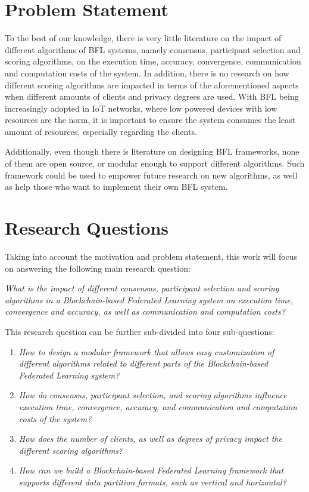 \section{Problem Statement}\label{intro:problem}

To the best of our knowledge, there is very little literature on the impact of different algorithms of BFL systems, namely consensus, participant selection and scoring algorithms, on the execution time, accuracy, convergence, communication and computation costs of the system. In addition, there is no research on how different scoring algorithms are impacted in terms of the aforementioned aspects when different amounts of clients and privacy degrees are used. With BFL being increasingly adopted in IoT networks, where low powered devices with low resources are the norm, it is important to ensure the system consumes the least amount of resources, especially regarding the clients.

Additionally, even though there is literature on designing BFL frameworks, none of them are open source, or modular enough to support different algorithms. Such framework could be used to empower future research on new algorithms, as well as help those who want to implement their own BFL system.

\section{Research Questions}\label{intro:questions}

Taking into account the motivation and problem statement, this work will focus on answering the following main research question:

\begin{center}
    \textit{What is the impact of different consensus, participant selection and scoring algorithms in a Blockchain-based Federated Learning system on execution time, convergence and accuracy, as well as communication and computation costs?}
\end{center}

This research question can be further sub-divided into four sub-questions:

\begin{enumerate}
    \item \textit{How to design a modular framework that allows easy customization of different algorithms related to different parts of the Blockchain-based Federated Learning system?}
    
    \item \textit{How do consensus, participant selection, and scoring algorithms influence execution time, convergence, accuracy, and communication and computation costs of the system?}
    
    \item \textit{How does the number of clients, as well as degrees of privacy impact the different scoring algorithms?}
    
    \item \textit{How can we build a Blockchain-based Federated Learning framework that supports different data partition formats, such as vertical and horizontal?}
\end{enumerate}

